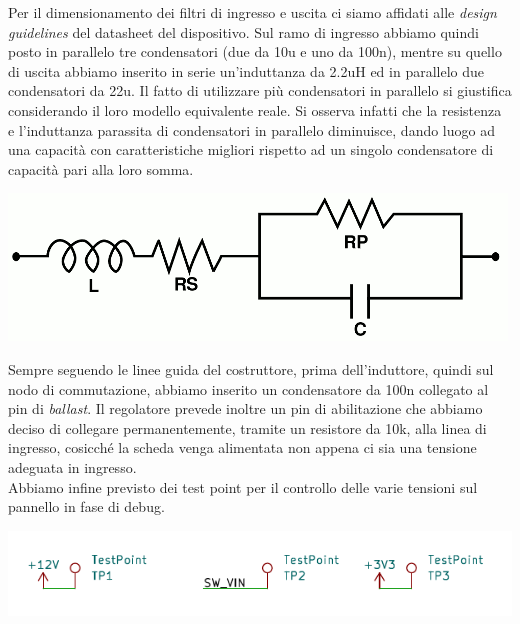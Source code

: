 \noindent Per il dimensionamento dei filtri di ingresso e uscita ci siamo affidati alle \textit{design guidelines} del datasheet del dispositivo. Sul ramo di ingresso abbiamo quindi posto in parallelo tre condensatori (due da 10u e uno da 100n), mentre su quello di uscita abbiamo inserito in serie un’induttanza da 2.2uH ed in parallelo due condensatori da 22u. Il fatto di utilizzare più condensatori in parallelo si giustifica considerando il loro modello equivalente reale. Si osserva infatti che la resistenza e l’induttanza parassita di condensatori in parallelo diminuisce, dando luogo ad una capacità con caratteristiche migliori rispetto ad un singolo condensatore di capacità pari alla loro somma.

\begin{center}
\includegraphics[scale=0.4]{figures/image37.png}
\captionsetup{type=figure}
\end{center}

\noindent Sempre seguendo le linee guida del costruttore, prima dell’induttore, 
quindi sul nodo di commutazione, abbiamo inserito un condensatore da 100n collegato al pin di \textit{ballast}.
Il regolatore prevede inoltre un pin di abilitazione che abbiamo deciso di collegare permanentemente, 
tramite un resistore da 10k, alla linea di ingresso, cosicché la scheda venga alimentata non appena ci 
sia una tensione adeguata in ingresso.\\
Abbiamo infine previsto dei test point per il controllo delle varie
tensioni sul pannello in fase di debug.

\begin{center}
\includegraphics[scale=0.75]{figures/image78.png}
\captionsetup{type=figure}
\end{center}

